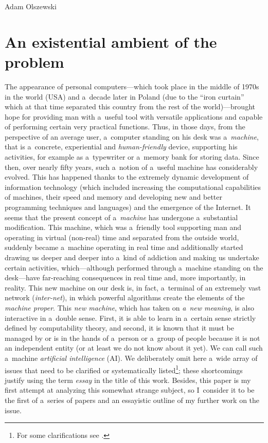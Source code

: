 \begin{artengenv}{Adam Olszewski}
\vspace{-2\baselineskip}

\section{An existential ambient of the problem}
The appearance of personal computers—which took place in the middle of 1970s in the world (USA) and a~decade later in Poland (due to the ``iron curtain'' which at that time separated this country from the rest of the world)—brought hope for providing man with a~useful tool with versatile applications and capable of performing certain very practical functions. Thus, in those days, from the perspective of an average user, a~computer standing on his desk was a~\textit{machine}, that is a~concrete, experiential and \textit{human-friendly} device, supporting his activities, for example as a~typewriter or a~memory bank for storing data. Since then, over nearly fifty years, such a~notion of a~useful machine has considerably evolved. This has happened thanks to the extremely dynamic development of information technology (which included increasing the computational capabilities of machines, their speed and memory and developing new and better programming techniques and languages) and the emergence of the Internet. It seems that the present concept of a~\textit{machine} has undergone a~substantial modification. This machine, which was a~friendly tool supporting man and operating in virtual (non-real) time and separated from the outside world, suddenly became a~machine operating in real time and additionally started drawing us deeper and deeper into a~kind of addiction and making us undertake certain activities, which—although performed through a~machine standing on the desk—have far-reaching consequences in real time and, more importantly, in reality. This new machine on our desk is, in fact, a~terminal of an extremely vast network (\textit{inter-net}), in which powerful algorithms create the elements of the \textit{machine proper}. This \textit{new machine}, which has taken on \textit{a~new meaning}, is also interactive in a~double sense. First, it is able to learn in a~certain sense strictly defined by computability theory, and second, it is known that it must be managed by or is in the hands of a~person or a~group of people because it is not an independent entity (or at least we do not know about it yet). We can call such a~machine \textit{artificial intelligence} (AI). We deliberately omit here a~wide array of issues that need to be clarified or systematically listed\footnote{For some clarifications see
\parencite[][]{krzanowski_meta-ontology_2022}.%
}; these shortcomings justify using the term \textit{essay} in the title of this work. Besides, this paper is my first attempt at analyzing this somewhat strange subject, so I~consider it to be the first of a~series of papers and an essayistic outline of my further work on the issue.


\end{artengenv}
